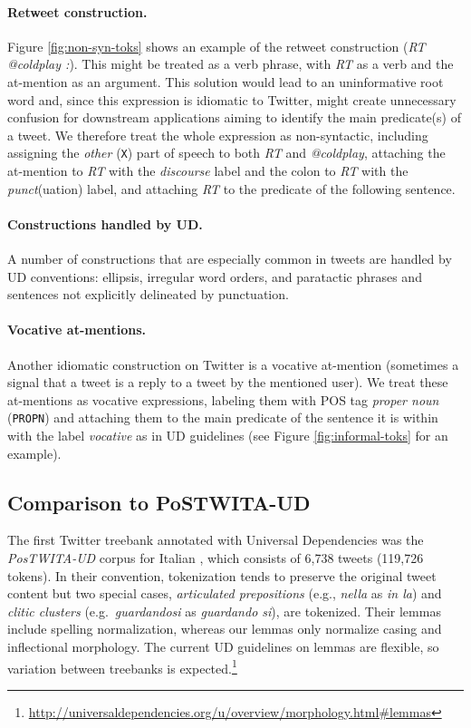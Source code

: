 \documentclass[11pt,a4paper]{article}
\begin{document}
\paragraph{Retweet construction.} Figure \ref{fig:non-syn-toks} shows
an example of the retweet construction (\emph{RT @coldplay :}).  This
might be treated as a verb phrase, with \emph{RT} as a verb and the
at-mention as an argument.
This solution would lead to an uninformative root
word and, since this expression is idiomatic to Twitter, might create
unnecessary confusion for downstream applications aiming to identify
the main predicate(s) of a tweet.  We therefore treat the whole
expression as non-syntactic, including assigning the \emph{other}
(\texttt{X}) part of speech to both \emph{RT} and \emph{@coldplay},
attaching the at-mention to \emph{RT} with the \emph{discourse}
label and the colon to \emph{RT} with the \emph{punct}(uation) label,
and attaching \emph{RT} to the predicate of the following sentence.





\paragraph{Constructions handled by UD.}  A number of constructions
that are especially common in tweets are handled by UD
conventions: ellipsis, irregular word orders, and paratactic phrases
and sentences 
not explicitly delineated by punctuation.
	


\paragraph{Vocative at-mentions.}  Another idiomatic construction on
Twitter is a vocative at-mention (sometimes a
signal that a tweet is a reply to a tweet by the mentioned user). We
treat these at-mentions as vocative expressions, labeling them with
POS tag
\emph{proper noun} (\texttt{PROPN}) and attaching them to the
main predicate of the sentence it is within with the label \emph{vocative} as in UD guidelines (see Figure \ref{fig:informal-toks} for an example).

\subsection{Comparison to PoSTWITA-UD}\label{sec:postwita}
The first Twitter treebank annotated with Universal Dependencies 
was the \mbox{\textit{PosTWITA-UD}} corpus for Italian \citep{sanguinetti-17}, 
which consists of 6,738 tweets (119,726 tokens).
In their convention, tokenization tends to preserve the original
tweet content but two special cases, \textit{articulated prepositions}
(e.g., \textit{nella} as \textit{in la})
and \textit{clitic clusters} (e.g.~\textit{guardandosi} as \textit{guardando si}), are tokenized.
Their lemmas include spelling normalization, whereas our lemmas only normalize casing and inflectional morphology.
The current UD guidelines on lemmas are flexible, so variation between treebanks is expected.\footnote{\url{http://universaldependencies.org/u/overview/morphology.html\#lemmas}}
\end{document}
